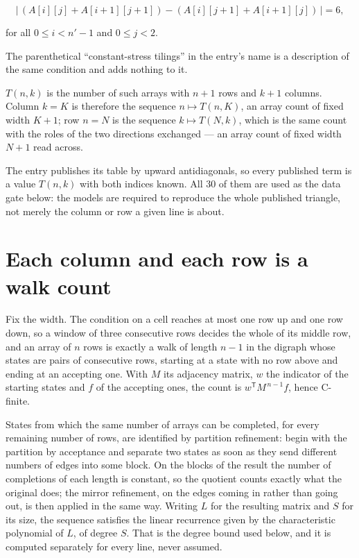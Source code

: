 \documentclass[11pt]{article}
\theoremstyle{definition}
\begin{document}
\[\bigl|\,(A[i][j] + A[i{+}1][j{+}1]) - (A[i][j{+}1] + A[i{+}1][j])\,\bigr| = 6,\]

for all $0 \le i < n'-1$ and $0 \le j < 2$.

The parenthetical ``constant-stress tilings'' in the entry's name is a description of the same condition and adds nothing to it.

$T(n,k)$ is the number of such arrays with $n + 1$ rows and $k + 1$ columns. Column $k = K$ is therefore the sequence $n \mapsto T(n,K)$, an array count of fixed width $K + 1$; row $n = N$ is the sequence $k \mapsto T(N,k)$, which is the same count with the roles of the two directions exchanged --- an array count of fixed width $N + 1$ read across.

The entry publishes its table by upward antidiagonals, so every published term is a value $T(n,k)$ with both indices known. All 30 of them are used as the data gate below: the models are required to reproduce the whole published triangle, not merely the column or row a given line is about.

\section{Each column and each row is a walk count}

Fix the width. The condition on a cell reaches at most one row up and one row down, so a window of three consecutive rows decides the whole of its middle row, and an array of $n$ rows is exactly a walk of length $n-1$ in the digraph whose states are pairs of consecutive rows, starting at a state with no row above and ending at an accepting one. With $M$ its adjacency matrix, $w$ the indicator of the starting states and $f$ of the accepting ones, the count is $w^{\mathsf T}M^{\,n-1}f$, hence C-finite.

States from which the same number of arrays can be completed, for every remaining number of rows, are identified by partition refinement: begin with the partition by acceptance and separate two states as soon as they send different numbers of edges into some block. On the blocks of the result the number of completions of each length is constant, so the quotient counts exactly what the original does; the mirror refinement, on the edges coming in rather than going out, is then applied in the same way. Writing $L$ for the resulting matrix and $S$ for its size, the sequence satisfies the linear recurrence given by the characteristic polynomial of $L$, of degree $S$. That is the degree bound used below, and it is computed separately for every line, never assumed.
\end{document}
